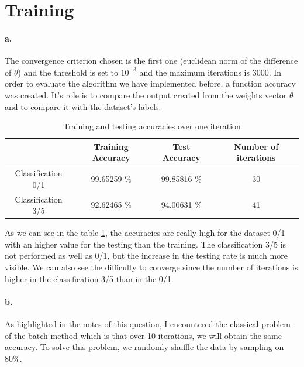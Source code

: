\documentclass[a4paper,11pt]{article}
\begin{document}
\section{Training}

\paragraph*{a.} 
The convergence criterion chosen is the first one (euclidean norm of the difference of $\theta$) and the threshold is set to $10^{-3}$ and the maximum iterations is 3000.
In order to evaluate the algorithm we have implemented before, a function accuracy was created. It's role is to compare the output created from the weights vector $\theta$ and to compare it with the dataset's labels.

\begin{table}[H]
\centering
\caption{Training and testing accuracies over one iteration}
\label{one iteration}
\begin{tabular}{c|c|c|c|}
\cline{2-4}
                                         & Training Accuracy & Test Accuracy & Number of iterations \\ \hline
\multicolumn{1}{|c|}{Classification 0/1} & 99.65259 $\%$       & 99.85816 $\%$   & 30                   \\ \hline
\multicolumn{1}{|c|}{Classification 3/5} & 92.62465 $\%$      & 94.00631 $\%$   & 41                   \\ \hline
\end{tabular}
\end{table}

As we can see in the table \ref{one iteration}, the accuracies are really high for the dataset 0/1 with an higher value for the testing than the training. The classification 3/5 is not performed as well as 0/1, but the increase in the testing rate is much more visible. We can also see the difficulty to converge since the number of iterations is higher in the classification 3/5 than in the 0/1.

\paragraph*{b.} 

As highlighted in the notes of this question, I encountered the classical problem of the batch method which is that over 10 iterations, we will obtain the same accuracy. To solve this problem, we randomly shuffle the data by sampling on $80\%$. 
\end{document}
